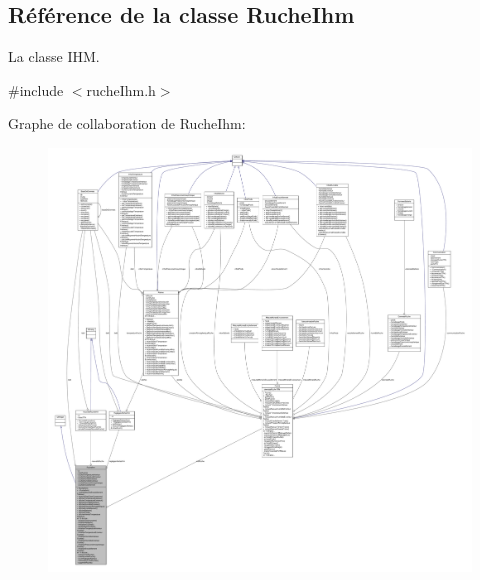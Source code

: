 \hypertarget{class_ruche_ihm}{}\subsection{Référence de la classe Ruche\+Ihm}
\label{class_ruche_ihm}


La classe I\+HM.  




{\ttfamily \#include $<$ruche\+Ihm.\+h$>$}



Graphe de collaboration de Ruche\+Ihm\+:\nopagebreak
\begin{figure}[H]
\begin{center}
\leavevmode
\includegraphics[width=350pt]{class_ruche_ihm__coll__graph}
\end{center}
\end{figure}
